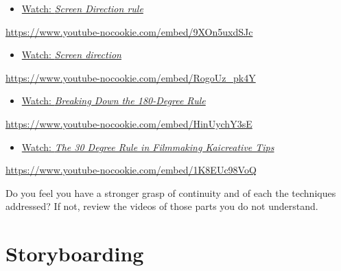 \documentclass[
  letterpaper,
  DIV=11,
  numbers=noendperiod]{scrreprt}
\providecommand{\tightlist}{%
  \setlength{\itemsep}{0pt}\setlength{\parskip}{0pt}}\usepackage{longtable,booktabs,array}
\begin{document}
\begin{tcolorbox}[enhanced jigsaw, titlerule=0mm, leftrule=.75mm, bottomrule=.15mm, colback=white, left=2mm, opacitybacktitle=0.6, title={Learning Activity}, colbacktitle=quarto-callout-note-color!10!white, colframe=quarto-callout-note-color-frame, bottomtitle=1mm, toptitle=1mm, opacityback=0, rightrule=.15mm, breakable, arc=.35mm, toprule=.15mm, coltitle=black]

\begin{itemize}
\tightlist
\item
  \href{https://www.youtube.com/watch?v=9XOn5uxdSJc}{Watch: \emph{Screen
  Direction rule}}
\end{itemize}

\url{https://www.youtube-nocookie.com/embed/9XOn5uxdSJc}

\begin{itemize}
\tightlist
\item
  \href{https://www.youtube.com/watch?v=RogoUz_pk4Y}{Watch: \emph{Screen
  direction}}
\end{itemize}

\url{https://www.youtube-nocookie.com/embed/RogoUz_pk4Y}

\begin{itemize}
\tightlist
\item
  \href{https://www.youtube.com/watch?v=HinUychY3sE}{Watch:
  \emph{Breaking Down the 180-Degree Rule}}
\end{itemize}

\url{https://www.youtube-nocookie.com/embed/HinUychY3sE}

\begin{itemize}
\tightlist
\item
  \href{https://www.youtube.com/watch?v=1K8EUc98VoQ}{Watch: \emph{The 30
  Degree Rule in Filmmaking \textbar{} Kaicreative \textbar{} Tips}}
\end{itemize}

\url{https://www.youtube-nocookie.com/embed/1K8EUc98VoQ}

Do you feel you have a stronger grasp of continuity and of each the
techniques addressed? If not, review the videos of those parts you do
not understand.

\end{tcolorbox}

\section{Storyboarding}\label{storyboarding}
\end{document}
